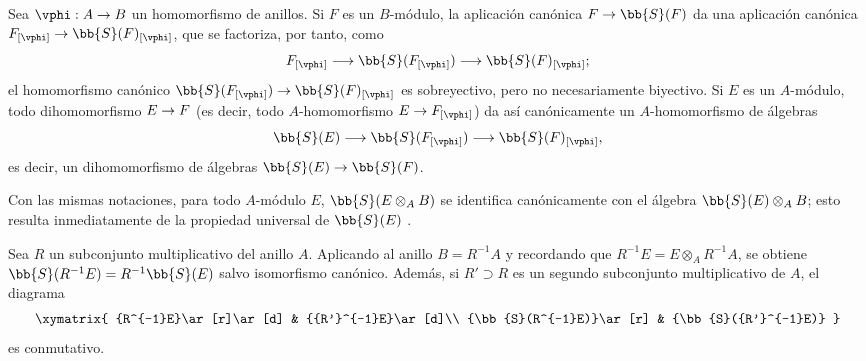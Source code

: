 \documentclass[oneside,10pt]{amsart}
\makeatletter
\newcommand{\ega@arrow}[2]{\mathchoice{#1}{#2}{#2}{#2}}
\renewcommand{\to}{\ega@arrow{\longrightarrow}{\rightarrow}}
\let\EGAOriginalLabel\label
\renewcommand{\label}[1]{\phantomsection\EGAOriginalLabel{#1}}
\makeatother
\begin{document}
\begin{env}[1.7.2]
\label{II.1.7.2}
Sea $\vphi:A\to B$ un homomorfismo de anillos.
Si $F$ es un $B$-módulo, la aplicación canónica $F\to\bb{S}(F)$ da una aplicación canónica $F_{[\vphi]}\to\bb{S}(F)_{[\vphi]}$, que se factoriza, por tanto, como
\[
  F_{[\vphi]}\to\bb{S}(F_{[\vphi]})\to\bb{S}(F)_{[\vphi]};
\]
el homomorfismo canónico $\bb{S}(F_{[\vphi]})\to\bb{S}(F)_{[\vphi]}$ es sobreyectivo, pero no necesariamente biyectivo.
Si $E$ es un $A$-módulo, todo dihomomorfismo $E\to F$ (es decir, todo $A$-homomorfismo $E\to F_{[\vphi]}$) da así canónicamente un $A$-homomorfismo de álgebras
\[
  \bb{S}(E)\to\bb{S}(F_{[\vphi]})\to\bb{S}(F)_{[\vphi]},
\]
es decir, un dihomomorfismo de álgebras $\bb{S}(E)\to\bb{S}(F)$.

Con las mismas notaciones, para todo $A$-módulo $E$, $\bb{S}(E\otimes_A B)$ se identifica canónicamente con el álgebra $\bb{S}(E)\otimes_A B$; esto resulta inmediatamente de la propiedad universal de $\bb{S}(E)$ .
\end{env}

\begin{env}[1.7.3]
\label{II.1.7.3}
Sea $R$ un subconjunto multiplicativo del anillo $A$.
Aplicando  al anillo $B=R^{-1}A$ y recordando que $R^{-1}E=E\otimes_A R^{-1}A$, se obtiene $\bb{S}(R^{-1}E)=R^{-1}\bb{S}(E)$ salvo isomorfismo canónico.
Además, si $R'\supset R$ es un segundo subconjunto multiplicativo de $A$, el diagrama
\[
  \xymatrix{
    {R^{-1}E}\ar[r]\ar[d] & {{R'}^{-1}E}\ar[d]\\
    {\bb{S}(R^{-1}E)}\ar[r] & {\bb{S}({R'}^{-1}E)}
  }
\]
es conmutativo.
\end{env}
\end{document}
